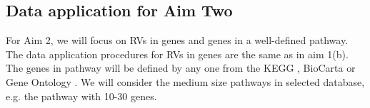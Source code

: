 \documentclass[12pt]{article}
\begin{document}
\subsection{Data application for Aim Two}
\label{sec:Data Application-aim2}
For Aim 2, we will focus on RVs in genes and genes in a well-defined pathway. The data application procedures for RVs in genes are the same as in aim 1(b). The genes in pathway will be defined by any one from the KEGG \cite{Ogata1999}, BioCarta \cite{Nishimura2001} or Gene Ontology \cite{Ashburner2000}. We will consider the medium size pathways in selected database, e.g. the pathway with 10-30 genes.





\newpage
%
%
%
%
%
\end{document}

